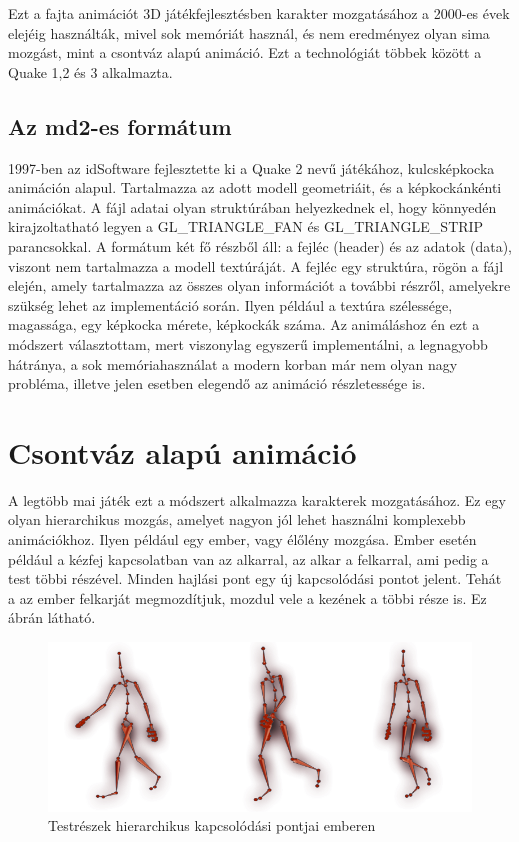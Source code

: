 Ezt a fajta animációt 3D játékfejlesztésben karakter mozgatásához a 2000-es évek elejéig használták, mivel sok memóriát használ, és nem eredményez olyan sima mozgást, mint a csontváz alapú animáció. Ezt a technológiát többek között a Quake 1,2 és 3 alkalmazta.

\subsection{Az md2-es formátum}

1997-ben az idSoftware fejlesztette ki a Quake 2 nevű játékához, kulcsképkocka animáción alapul. Tartalmazza az adott modell geometriáit, és a képkockánkénti animációkat. A fájl adatai olyan struktúrában helyezkednek el, hogy könnyedén kirajzoltatható legyen a GL\_TRIANGLE\_FAN és GL\_TRIANGLE\_STRIP parancsokkal. A formátum két fő részből áll: a fejléc (header) és az adatok (data), viszont nem tartalmazza a modell textúráját. A fejléc egy struktúra, rögön a fájl elején, amely tartalmazza az összes olyan információt a további részről, amelyekre szükség lehet az implementáció során. Ilyen például a textúra szélessége, magassága, egy képkocka mérete, képkockák száma. Az animáláshoz én ezt a módszert választottam, mert viszonylag egyszerű implementálni, a legnagyobb hátránya, a sok memóriahasználat a modern korban már nem olyan nagy probléma, illetve jelen esetben elegendő az animáció részletessége is. 

\section{Csontváz alapú animáció}

A legtöbb mai játék ezt a módszert alkalmazza karakterek mozgatásához. Ez egy olyan hierarchikus mozgás, amelyet nagyon jól lehet használni komplexebb animációkhoz. Ilyen például egy ember, vagy élőlény mozgása. Ember esetén például a kézfej kapcsolatban van az alkarral, az alkar a felkarral, ami pedig a test többi részével. Minden hajlási pont egy új kapcsolódási pontot jelent. Tehát a az ember felkarját megmozdítjuk, mozdul vele a kezének a többi része is. Ez  ábrán látható.


\begin{figure}[h]
\centering
\includegraphics[scale=0.5]{kepek/skeletal_anim.png}
\caption{Testrészek hierarchikus kapcsolódási pontjai emberen}
\label{fig:skeletal}
\end{figure}

